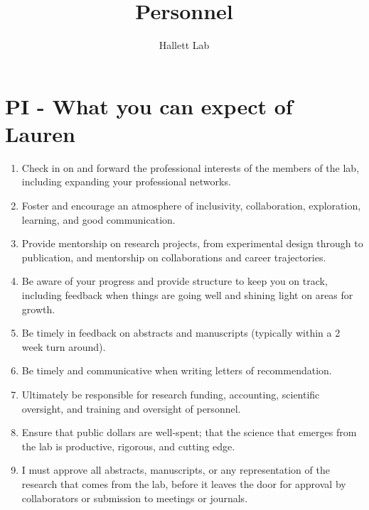 \documentclass[12pt]{article}
\title{Personnel}
\author{Hallett Lab}
\begin{document}
\maketitle

\section{PI - What you can expect of Lauren}
\begin{enumerate}
\item Check in on and forward the professional interests of the members of the lab, including expanding your professional networks.
\item Foster and encourage an atmosphere of inclusivity, collaboration, exploration,
  learning, and good communication.
\item Provide mentorship on research projects, from experimental design through to publication, and mentorship on collaborations and career trajectories.
\item Be aware of your progress and provide structure to keep you on track, including feedback when things are going well and shining light on areas for growth.
\item Be timely in feedback on abstracts and manuscripts (typically within a 2 week turn around).
\item Be timely and communicative when writing letters of recommendation.
\item Ultimately be responsible for research funding, accounting,
  scientific oversight, and training and oversight of personnel.
\item Ensure that public dollars are
  well-spent; that the science that emerges from the lab is productive,
  rigorous, and cutting edge.
\item I must approve all abstracts, manuscripts, or any representation
  of the research that comes from the lab, before it leaves the door
  for approval by collaborators or submission to meetings or journals.
\end{enumerate}
\end{document}
